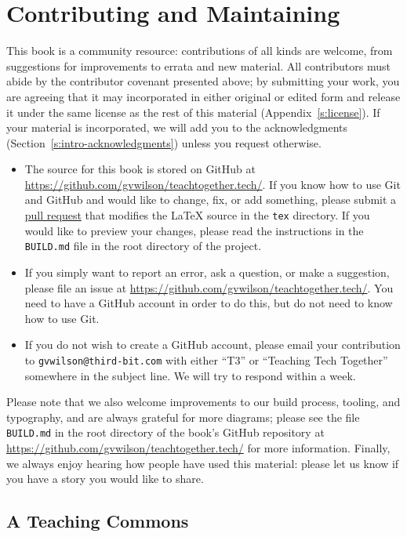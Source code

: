 \section{Contributing and Maintaining}\label{s:joining-contributing}

This book is a community resource: contributions of all kinds are
welcome, from suggestions for improvements to errata and new material.
All contributors must abide by the contributor covenant presented above;
by submitting your work, you are agreeing that it may incorporated in
either original or edited form and release it under the same license as
the rest of this material (Appendix~\ref{s:license}). If your material is
incorporated, we will add you to the acknowledgments
(Section~\ref{s:intro-acknowledgments}) unless you request otherwise.

\begin{itemize}
\item
  The source for this book is stored on GitHub at
  \url{https://github.com/gvwilson/teachtogether.tech/}. If you know how to use Git and
  GitHub and would like to change, fix, or add something, please
  submit a \protect\hyperlink{g:pull-request}{pull request} that modifies the LaTeX
  source in the \texttt{tex} directory. If you would like to preview your
  changes, please read the instructions in the \texttt{BUILD.md} file in the
  root directory of the project.
\item
  If you simply want to report an error, ask a question, or make a
  suggestion, please file an issue at
  \url{https://github.com/gvwilson/teachtogether.tech/}. You need to have a GitHub account in
  order to do this, but do not need to know how to use Git.
\item
  If you do not wish to create a GitHub account, please email your
  contribution to \texttt{gvwilson@third-bit.com} with either
  ``T3'' or ``Teaching Tech Together'' somewhere in the subject line. We
  will try to respond within a week.
\end{itemize}

Please note that we also welcome improvements to our build process,
tooling, and typography, and are always grateful for more diagrams;
please see the file \texttt{BUILD.md} in the root directory of the book's
GitHub repository at \url{https://github.com/gvwilson/teachtogether.tech/} for more
information. Finally, we always enjoy hearing how people have used
this material: please let us know if you have a story you would like
to share.

\subsection{A Teaching Commons}\label{a-teaching-commons}

